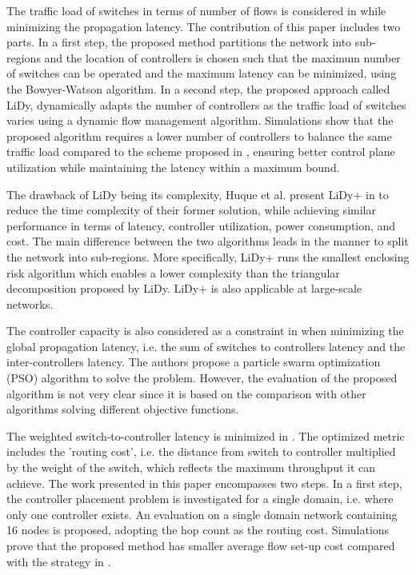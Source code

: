 \documentclass{IEEEtran}
\begin{document}
The traffic load of switches in terms of number of flows is considered in \cite{HuJo15} while minimizing the propagation latency. The contribution of this paper includes two parts. In a first step, the proposed method partitions the network into sub-regions and the location of controllers is chosen such that the maximum number of switches can be operated and the maximum latency can be minimized,  using the Bowyer-Watson algorithm. In a second step, the proposed approach called LiDy, dynamically adapts the number of controllers as the traffic load of switches varies using a dynamic flow management algorithm. Simulations show that the proposed algorithm requires a lower number of controllers to balance the same traffic load compared to the scheme proposed in \cite{YaBi14}, ensuring better control plane utilization while maintaining the latency within a maximum bound. 

The drawback of LiDy being its complexity, Huque et al. present LiDy+ in \cite{HuSi17} to reduce the time complexity of their former solution, while achieving similar performance in terms of latency, controller utilization, power consumption, and cost. The main difference between the two algorithms leads in the manner to split the network into sub-regions. More specifically, LiDy+ runs the smallest enclosing risk algorithm which enables a lower complexity than the triangular decomposition proposed by LiDy. LiDy+ is also applicable at large-scale networks.

The controller capacity is also considered as a constraint in \cite{GaWa15} when minimizing the global propagation latency, i.e. the sum of switches to controllers latency and the inter-controllers latency. The authors propose a particle swarm optimization (PSO) algorithm to solve the problem. However, the evaluation of the proposed algorithm is not very clear since it is based on the comparison with other algorithms solving different objective functions. 

The weighted switch-to-controller latency is minimized in \cite{YaHo15}. The optimized metric includes the 'routing cost', i.e. the distance from switch to controller multiplied by the weight of the switch, which reflects the maximum throughput it can achieve. The work presented in this paper encompasses two steps. In a first step, the controller placement problem is investigated for a single domain, i.e. where only one controller exists. An evaluation on a single domain network containing 16 nodes is proposed, adopting the hop count as the routing cost. Simulations prove that the proposed method has smaller average flow set-up cost compared with the strategy in \cite{HeSh12}. 
\end{document}
